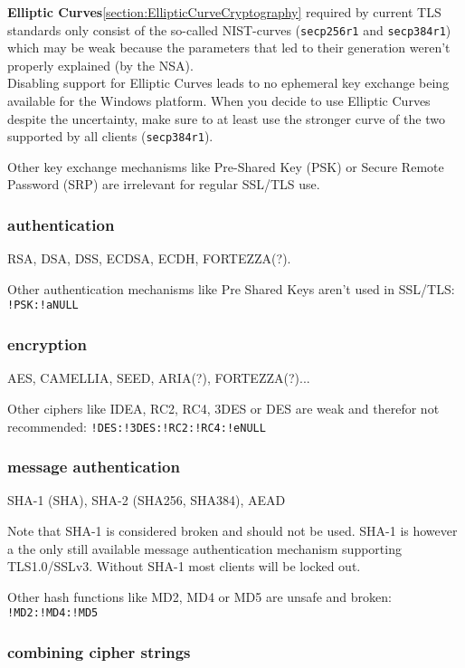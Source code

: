 \textbf{Elliptic Curves}\ref{section:EllipticCurveCryptography} required by current TLS
standards only consist of the so-called NIST-curves (\texttt{secp256r1} and
\texttt{secp384r1}) which may be weak because the parameters that led to their generation
weren't properly explained (by the NSA). \\
Disabling support for Elliptic Curves leads to no ephemeral key exchange being available
for the Windows platform. When you decide to use Elliptic Curves despite the uncertainty,
make sure to at least use the stronger curve of the two supported by all clients
(\texttt{secp384r1}).


Other key exchange mechanisms like Pre-Shared Key (PSK) or Secure Remote Password
(SRP) are irrelevant for regular SSL/TLS use.

\subsubsection{authentication}

RSA, DSA, DSS, ECDSA, ECDH, FORTEZZA(?).

Other authentication mechanisms like Pre Shared Keys aren't used in SSL/TLS: \texttt{!PSK:!aNULL}

\subsubsection{encryption}

AES, CAMELLIA, SEED, ARIA(?), FORTEZZA(?)...

Other ciphers like IDEA, RC2, RC4, 3DES or DES are weak and therefor not recommended:
\texttt{!DES:!3DES:!RC2:!RC4:!eNULL}

\subsubsection{message authentication}

SHA-1 (SHA), SHA-2 (SHA256, SHA384), AEAD

Note that SHA-1 is considered broken and should not be used. SHA-1 is however a the
only still available message authentication mechanism supporting TLS1.0/SSLv3. Without
SHA-1 most clients will be locked out.

Other hash functions like MD2, MD4 or MD5 are unsafe and broken: \texttt{!MD2:!MD4:!MD5}

\subsubsection{combining cipher strings}

